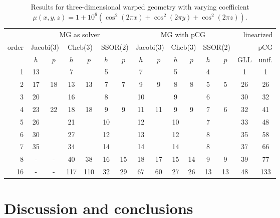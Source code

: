 \documentclass[smallcondensed,final]{svjour3}     %
\begin{document}
\begin{table}
  \caption{\label{tab:3d-fan} Results for three-dimensional warped geometry
    with varying coefficient $\mu(x,y,z) = 1 + 10^6(\cos^2(2\pi x) + \cos^2(2\pi y) + \cos^2(2\pi z))$.}
  \centering
  \begin{tabular}{|r|c c|c c|c c||c c|c c|c c||c c|} 
    \hline
    & \multicolumn{6}{c||}{MG as solver} & \multicolumn{6}{c||}{MG with pCG} & \multicolumn{2}{r|}{linearized} \\
    \cline{2-13}
    \!\!\! order \!\!\!\! &  \multicolumn{2}{c|}{\!\scriptsize  Jacobi(3)\!} &  \multicolumn{2}{c|}{\!\scriptsize Cheb(3)\!} & \multicolumn{2}{c||}{\!\scriptsize  SSOR(2)\!} & \multicolumn{2}{c|}{\!\scriptsize Jacobi(3)\!} &  \multicolumn{2}{c|}{\!\scriptsize Cheb(3)\!} & \multicolumn{2}{c||}{\!\scriptsize SSOR(2)\!} & \multicolumn{2}{r|}{pCG}\\
\hline
 & $h$ & $p$ & $h$ & $p$& $h$ & $p$& $h$ & $p$& $h$ & $p$& $h$ & $p$& GLL & unif.\\
 \cline{2-15}
1 & 13 & & 7 & & 5 & & 7 & & 5 & & 4 & & 1 & 1  \\
2 & 17 & 18 & 13 & 13 & 7 & 7 & 9 & 9 & 8 & 8 & 5 & 5 & 26 & 26 \\
3 & 20 & & 16 & & 8 & & 10 & & 9 & & 6 & & 30 & 32  \\
4 & 23 & 22 & 18 & 18 & 9 & 9 & 11 & 11 & 9 & 9 & 7 & 6 & 32 & 41 \\
5 & 26 & & 21 & & 10 & & 12 & & 10 & & 7 & & 33 & 48  \\
6 & 30 & & 27 & & 12 & & 13 & & 12 & & 8 & & 35 & 58  \\
7 & 35 & & 34 & & 14 & & 14 & & 14 & & 8 & & 37 & 66  \\
8 & - & - & 40 & 38 & 16 & 15 & 18 & 17 & 15 & 14 & 9 & 9 & 39 & 77 \\
16 & - & - & 117 & 110 & 32 & 29 & 67 & 60 & 27 & 26 & 13 & 13 & 48 & 133 \\
\hline
  \end{tabular}
\end{table}


\section{Discussion and conclusions}

\end{document}
